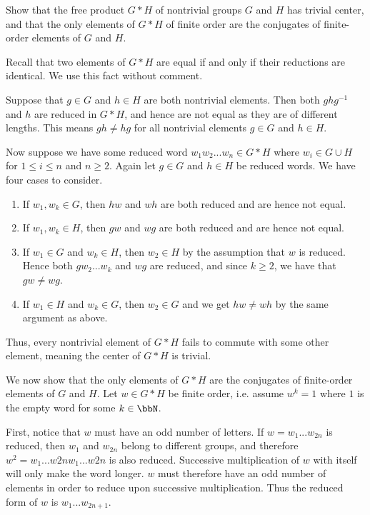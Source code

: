 \begin{homework}[e]
   Show that the free product $G \ast H$ of nontrivial groups $G$ and $H$ has trivial center, and that the only elements of $G \ast H$ of finite order are the conjugates of finite-order elements of $G$ and $H$.
  \begin{prf}
    Recall that two elements of $G\ast H$ are equal if and only if their reductions are identical. We use this fact without comment.

    Suppose that $g \in G$ and $h \in H$ are both nontrivial elements. Then both $ghg^{-1}$ and $h$ are reduced in $G\ast H$, and hence are not equal as they are of different lengths. This means $gh \neq hg$ for all nontrivial elements $g\in G$ and $h \in H$.

    Now suppose we have some reduced word $w_1w_2...w_n \in G\ast H$ where $w_i \in G \cup H$ for $1\leq i\leq n$ and $n \geq 2$. Again let $g \in G$ and $h \in H$ be reduced words. We have four cases to consider.
    \begin{enumerate}[(1)]
      \item If $w_1,w_k \in G$, then $hw$ and $wh$ are both reduced and are hence not equal.
      \item If $w_1,w_k \in H$, then $gw$ and $wg$ are both reduced and are hence not equal.
      \item If $w_1 \in G$ and $w_k \in H$, then $w_2 \in H$ by the assumption that $w$ is reduced. Hence both $gw_2...w_k$ and $wg$ are reduced, and since $k\geq 2$, we have that $gw \neq wg$.
      \item If $w_1 \in H$ and $w_k \in G$, then $w_2 \in G$ and we get $hw \neq wh$ by the same argument as above.
    \end{enumerate}
    Thus, every nontrivial element of $G\ast H$ fails to commute with some other element, meaning the center of $G\ast H$ is trivial.

    We now show that the only elements of $G*H$ are the conjugates of finite-order elements of $G$ and $H$. Let $w \in G*H$ be finite order, i.e. assume $w^k = 1$ where $1$ is the empty word for some $k \in \bbN$. 
    
    First, notice that $w$ must have an odd number of letters. If $w = w_1...w_{2n}$ is reduced, then $w_1$ and $w_{2n}$ belong to different groups, and therefore $w^2 = w_1...w{2n}w_1...w{2n}$ is also reduced. Successive multiplication of $w$ with itself will only make the word longer. $w$ must therefore have an odd number of elements in order to reduce upon successive multiplication. Thus the reduced form of $w$ is $w_1...w_{2n+1}$. 
    

\end{prf}
\end{homework}
